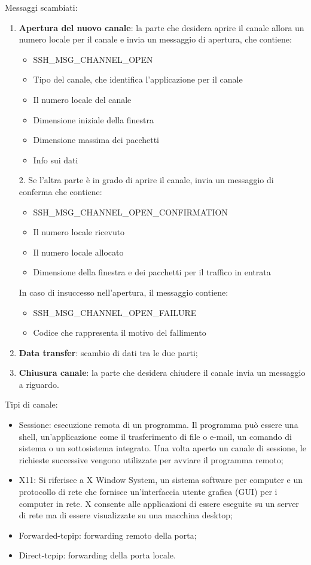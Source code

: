 Messaggi scambiati:
\begin{enumerate}
    \item \textbf{Apertura del nuovo canale}: la parte che desidera aprire il canale allora un numero locale per il canale e invia un messaggio di apertura, che contiene:
	\begin{itemize}
	    \item SSH\_MSG\_CHANNEL\_OPEN
		\item Tipo del canale, che identifica l'applicazione per il canale
		\item Il numero locale del canale
		\item Dimensione iniziale della finestra
		\item Dimensione massima dei pacchetti
		\item Info sui dati
	\end{itemize}
	2. Se l'altra parte è in grado di aprire il canale, invia un messaggio di conferma che contiene:
	\begin{itemize}
	    \item SSH\_MSG\_CHANNEL\_OPEN\_CONFIRMATION
		\item Il numero locale ricevuto
		\item Il numero locale allocato
		\item Dimensione della finestra e dei pacchetti per il traffico in entrata
	\end{itemize}
	In caso di insuccesso nell'apertura, il messaggio contiene:
	\begin{itemize}
	    \item SSH\_MSG\_CHANNEL\_OPEN\_FAILURE
		\item Codice che rappresenta il motivo del fallimento
	\end{itemize}
	\item \textbf{Data transfer}: scambio di dati tra le due parti;
	\item \textbf{Chiusura canale}: la parte che desidera chiudere il canale invia un messaggio a riguardo.
\end{enumerate}

Tipi di canale:
\begin{itemize}
    \item Sessione: esecuzione remota di un programma. Il programma può essere una shell, un'applicazione come il trasferimento di file o e-mail, un comando di sistema o un sottosistema integrato. Una volta aperto un canale di sessione, le richieste successive vengono utilizzate per avviare il programma remoto;
	\item X11: Si riferisce a X Window System, un sistema software per computer e un protocollo di rete che fornisce un'interfaccia utente grafica (GUI) per i computer in rete. X consente alle applicazioni di essere eseguite su un server di rete ma di essere visualizzate su una macchina desktop;
	\item Forwarded-tcpip: forwarding remoto della porta;
	\item Direct-tcpip: forwarding della porta locale.
\end{itemize}

